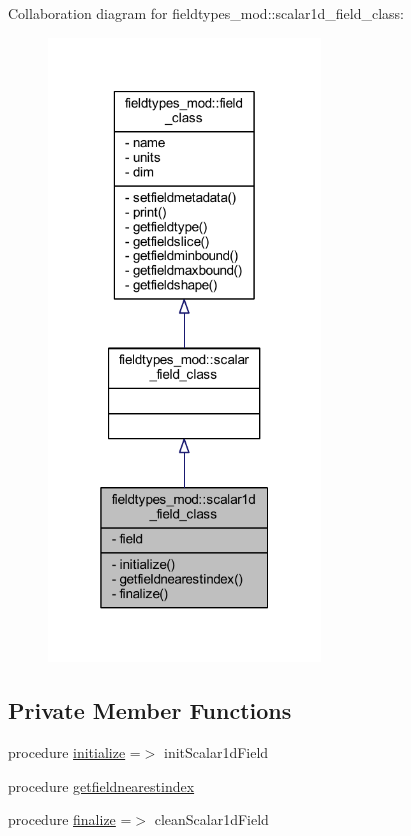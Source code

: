 Collaboration diagram for fieldtypes\+\_\+mod\+:\+:scalar1d\+\_\+field\+\_\+class\+:\nopagebreak
\begin{figure}[H]
\begin{center}
\leavevmode
\includegraphics[width=205pt]{structfieldtypes__mod_1_1scalar1d__field__class__coll__graph}
\end{center}
\end{figure}
\subsection*{Private Member Functions}
\begin{DoxyCompactItemize}
\item 
procedure \mbox{\hyperlink{structfieldtypes__mod_1_1scalar1d__field__class_aa5e83bedb5d56d7e666fde274435a04f}{initialize}} =$>$ init\+Scalar1d\+Field
\item 
procedure \mbox{\hyperlink{structfieldtypes__mod_1_1scalar1d__field__class_a006ddd4810ef1ddccef091a4600b9925}{getfieldnearestindex}}
\item 
procedure \mbox{\hyperlink{structfieldtypes__mod_1_1scalar1d__field__class_a6e7993e87fad9d6b56af43ae1bb0a36a}{finalize}} =$>$ clean\+Scalar1d\+Field
\end{DoxyCompactItemize}
